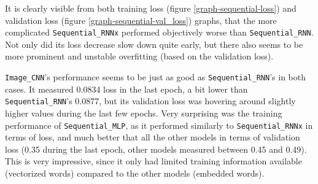 It is clearly visible from both training loss (figure \ref{graph-sequential-loss}) and validation loss (figure
\ref{graph-sequential-val_loss}) graphs, that the more complicated \texttt{Sequential\_RNNx} performed objectively
worse than \texttt{Sequential\_RNN}. Not only did its loss decrease slow down quite early, but there also seems
to be more prominent and unstable overfitting (based on the validation loss).

\texttt{Image\_CNN}'s performance seems to be just as good as \texttt{Sequential\_RNN}'s in both cases.
It measured 0.0834 loss in the last epoch, a bit lower than \texttt{Sequential\_RNN}'s 0.0877, but its validation
loss was hovering around slightly higher values during the last few epochs.
Very surprising was the training performance of \texttt{Sequential\_MLP}, as it performed similarly to \texttt{Sequential\_RNNx} in terms of loss, and much better that all the other models in terms of validation loss
(0.35 during the last epoch, other models measured between 0.45 and 0.49).
This is very impressive, since it only had limited training information available (vectorized words) compared
to the other models (embedded words).


